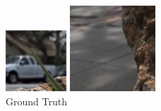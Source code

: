 \documentclass[10pt,twocolumn,letterpaper]{article}
\begin{document}
\begin{figure}[h]
\begin{multicols}{2}
\begin{multicols}{3}
            \includegraphics[width=\linewidth]{rock_crop_leaf/truth_05_05.png}\par\vspace{0.1in}\includegraphics[width=\linewidth]{rock_crop_walk/truth_05_05.png}\par\caption*{Ground Truth}

\end{multicols}
\end{multicols}
\end{figure}
\end{document}
